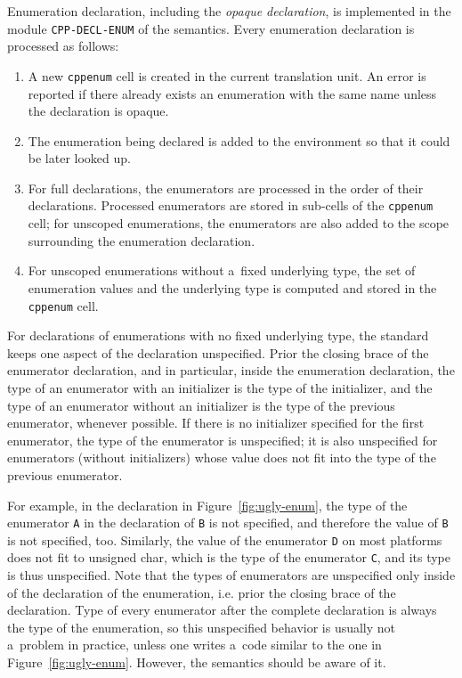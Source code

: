 \documentclass[nolot,nolof,nocover,printed]{fithesis3}
\begin{document}
Enumeration declaration, including the \textit{opaque declaration}, is implemented in the module \lstinline|CPP-DECL-ENUM| of the semantics.
Every enumeration declaration is processed as follows:
\begin{enumerate}
\item A new \lstinline|cppenum| cell is created in the current translation unit. An error is reported if there already exists an enumeration with the same name unless the declaration is opaque.
\item The enumeration being declared is added to the environment so that it could be later looked up.
\item For full declarations, the enumerators are processed in the order of their declarations. Processed enumerators are stored in sub-cells of the \lstinline|cppenum| cell; for unscoped enumerations, the enumerators are also added to the scope surrounding the enumeration declaration.
\item For unscoped enumerations without a~fixed underlying type, the set of enumeration values and the underlying type is computed and stored in the \lstinline|cppenum| cell.
\end{enumerate}

For declarations of enumerations with no fixed underlying type, the standard keeps one aspect of the declaration unspecified. Prior the closing brace of the enumerator declaration, and in particular, inside the enumeration declaration, the type of an enumerator with an initializer is the type of the initializer, and the type of an enumerator without an initializer is the type of the previous enumerator, whenever possible. If there is no initializer specified for the first enumerator, the type of the enumerator is unspecified; it is also unspecified for enumerators (without initializers) whose value does not fit into the type of the previous enumerator. 

For example, in the declaration in Figure~\ref{fig:ugly-enum}, the type of the enumerator \lstinline|A| in the declaration of \lstinline|B| is not specified, and therefore the value of \lstinline|B| is not specified, too. Similarly, the value of the enumerator \lstinline|D| on most platforms does not fit to unsigned char, which is the type of the enumerator \lstinline|C|, and its type is thus unspecified. Note that the types of enumerators are unspecified only inside of the declaration of the enumeration, i.e. prior the closing brace of the declaration. Type of every enumerator after the complete declaration is always the type of the enumeration, so this unspecified behavior is usually not a~problem in practice, unless one writes a~code similar to the one in Figure~\ref{fig:ugly-enum}. However, the semantics should be aware of it.
\end{document}
